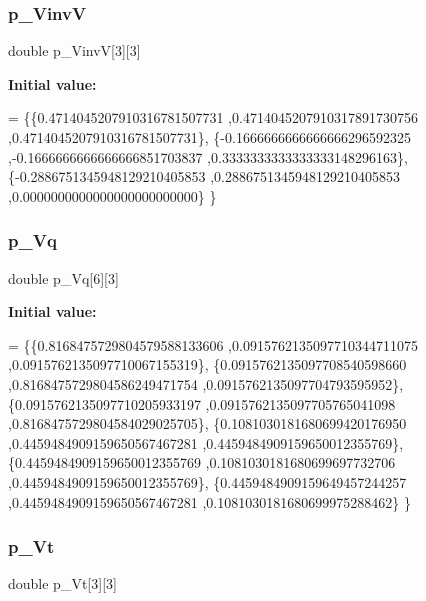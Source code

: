 \subsubsection{\texorpdfstring{p\+\_\+\+VinvV}{p\_VinvV}}
{\footnotesize\ttfamily double p\+\_\+\+VinvV\mbox{[}3\mbox{]}\mbox{[}3\mbox{]}}

{\bfseries Initial value\+:}
\begin{DoxyCode}
= \{\{0.4714045207910316781507731 ,0.4714045207910317891730756 ,0.4714045207910316781507731\},
\{-0.1666666666666666296592325 ,-0.1666666666666666851703837 ,0.3333333333333333148296163\},
\{-0.2886751345948129210405853 ,0.2886751345948129210405853 ,0.0000000000000000000000000\}
\}
\end{DoxyCode}
\mbox{\label{a00446_af83b82893fe0d3852209104945a9aed0}} 
\subsubsection{\texorpdfstring{p\+\_\+\+Vq}{p\_Vq}}
{\footnotesize\ttfamily double p\+\_\+\+Vq\mbox{[}6\mbox{]}\mbox{[}3\mbox{]}}

{\bfseries Initial value\+:}
\begin{DoxyCode}
= \{\{0.8168475729804579588133606 ,0.0915762135097710344711075 ,0.0915762135097710067155319\},
\{0.0915762135097708540598660 ,0.8168475729804586249471754 ,0.0915762135097704793595952\},
\{0.0915762135097710205933197 ,0.0915762135097705765041098 ,0.8168475729804584029025705\},
\{0.1081030181680699420176950 ,0.4459484909159650567467281 ,0.4459484909159650012355769\},
\{0.4459484909159650012355769 ,0.1081030181680699697732706 ,0.4459484909159650012355769\},
\{0.4459484909159649457244257 ,0.4459484909159650567467281 ,0.1081030181680699975288462\}
\}
\end{DoxyCode}
\mbox{\label{a00446_a86cf67eade76e86bd82c6e60ce38d8bc}} 
\subsubsection{\texorpdfstring{p\+\_\+\+Vt}{p\_Vt}}
{\footnotesize\ttfamily double p\+\_\+\+Vt\mbox{[}3\mbox{]}\mbox{[}3\mbox{]}}

